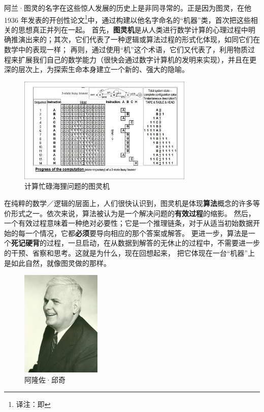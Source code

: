 \documentclass[a4paper,12pt]{article}
\begin{document}
阿兰·图灵的名字在这些惊人发展的历史上是非同寻常的。正是因为图灵，在他 1936 年发表的开创性论文\footnote[3]{译注：即\cite{TuringA1937}}中，通过构建以他名字命名的“机器”类，首次把这些相关的思想真正并列在一起。
首先，\textbf{\gls{图灵机}}是从人类进行数学计算的心理过程中明确推演出来的；其次，它们代表了一种\gls{逻辑}或\gls{算法}过程的\gls{形式化}体现，如同它们在数学中的表现一样；
再则，通过使用“机”这个术语，它们又代表了，利用\gls{物质过程}来扩展我们自己的数学能力（很快会通过\gls{数字计算机}的发明来实现），并且在更深的层次上，为探索生命本身建立一个新的、强大的隐喻。

\begin{figure}[ht]
\centering
\includegraphics[height=2.0in]{images/turing_machine.jpg}
\caption{计算忙碌海狸问题的图灵机}
\end{figure}

在纯粹的数学／\gls{逻辑}的层面上，人们很快认识到，\gls{图灵机}是体现\textbf{\gls{算法}}概念的许多等价形式之一。依次来说，\gls{算法}被认为是一个解决问题的\textbf{\gls{有效过程}}的缩影。
然后，一个\gls{有效过程}意味着一种绝对必要性；它是一个\gls{推理链条}，对于从适当初始数据开始的每一个情况，它都\textbf{必须}要导向相应的那个答案或解答。
更进一步，\gls{算法}是一个\textbf{死记硬背}的过程，一旦启动，在从数据到解答的无休止的过程中，不需要进一步的干预、省察和思考。这就是为什么，现在回想起来，
把它体现在一台“机器”上是如此自然，就像图灵做的那样。

\begin{figure}
  \begin{center}
    \includegraphics[height=2.0in]{images/alonzo_church.jpg}
  \end{center}
  \caption{阿隆佐·邱奇}
\end{figure}
\end{document}
